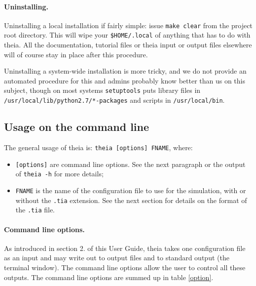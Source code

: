\documentclass{article}
\renewcommand{\tt}[1]{\texttt{#1}}
\begin{document}
\paragraph{Uninstalling.} Uninstalling a local installation if fairly simple: issue \tt{make clear} from the project root directory. This will wipe your \tt{\$HOME/.local} of anything that has to do with theia. All the documentation, tutorial files or theia input or output files elsewhere will of course stay in place after this procedure.

Uninstalling a system-wide installation is more tricky, and we do not provide an automated procedure for this and admins probably know better than us on this subject, though on most systems \tt{setuptools} puts library files in \tt{/usr/local/lib/python2.7/*-packages} and scripts in \tt{/usr/local/bin}.

\subsection{Usage on the command line}
The general usage of theia is: \tt{theia [options] FNAME}, where:

\begin{itemize}
\item \tt{[options]} are command line options. See the next paragraph or the output of \tt{theia -h} for more details;
\item \tt{FNAME} is the name of the configuration file to use for the simulation, with or without the \tt{.tia} extension. See the next section for details on the format of the \tt{.tia} file.
\end{itemize}

\paragraph{Command line options.}As introduced in section 2. of this User Guide, theia takes one configuration file as an input and may write out to output files and to standard output (the terminal window). The command line options allow the user to control all these outputs. The command line options are summed up in table \ref{option}.
\end{document}
